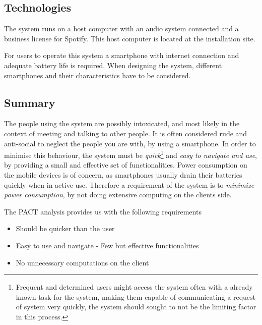 \subsection{Technologies}
\label{sub:pact_technologies}

The system runs on a host computer with an audio system connected and a business license for Spotify.  This host computer is located at the installation site.

For users to operate this system a smartphone with internet connection and adequate battery life is required. 
When designing the system, different smartphones and their characteristics have to be considered.

\subsection{Summary}
\label{sec:pact_summary}

The people using the system are possibly intoxicated, and most likely in the context of meeting and talking to other people. It is often considered rude and anti-social to neglect the people you are with, by using a smartphone. In order to minimise this behaviour, the system must be \textit{quick}\footnote{Frequent and determined users might access the system often with a already known task for the system, making them capable of communicating a request of system very quickly, the system should sought to not be the limiting factor in this process.} and \textit{easy to navigate and use}, by providing a small and effective set of functionalities.
Power consumption on the mobile devices is of concern, as smartphones usually drain their batteries quickly when in active use. Therefore a requirement of the system is to \textit{minimize power consumption}, by not doing extensive computing on the clients side.


The PACT analysis provides us with the following requirements
\begin{itemize}
  \item Should be quicker than the user
  \item Easy to use and navigate - Few but effective functionalities
  \item No unnecessary computations on the client
\end{itemize}
